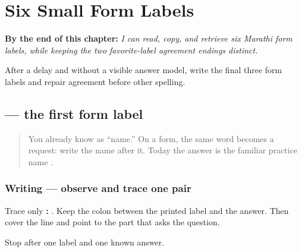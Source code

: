 
\chapter{Six Small Form Labels}
\label{ch:mr-a1-form-labels}

\begin{chapteropening}
\textbf{By the end of this chapter:} \emph{I can read, copy, and retrieve six Marathi form labels, while keeping the two favorite-label agreement endings distinct.}

After a delay and without a visible answer model, write the final three form labels and repair agreement before other spelling.
\end{chapteropening}

\section[\texorpdfstring{\mr{नाव}: \mr{मीरा} (nāv: Mīrā)}{नाव: मीरा (nāv: Mīrā)}]{ — the first form label}

\label{lesson:MR-A1F01-naav}



\begin{quote}
You already know \textbf{} as “name.” On a form, the same word becomes a request: write the name after it. Today the answer is the familiar practice name \textbf{}.
\end{quote}

\subsection*{Writing — observe and trace one pair}
Trace only \textbf{: }. Keep the colon between the printed label and the answer. Then cover the line and point to the part that asks the question.

\begin{tcolorbox}[breakable,colback=teal!4,colframe=teal!35!black,title={Before you move on}]
Stop after one label and one known answer.
\end{tcolorbox}
